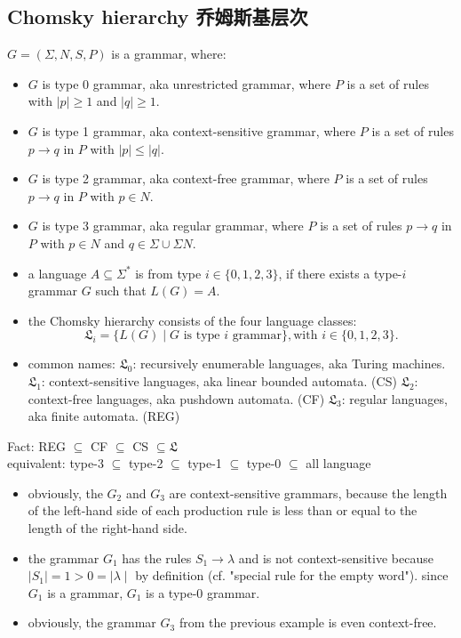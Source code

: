 \documentclass[a4paper,11pt,utf8]{article}
\newcommand{\newindent}{\\ \hspace*{\parindent}}
\begin{document}
\subsection{Chomsky hierarchy 乔姆斯基层次}
\begin{tcolorbox}[title=Chomsky hierarchy,colback=white,colframe=black,width=\textwidth,arc=0pt]
    $G = (\Sigma,N,S,P)$ is a grammar, where:
    \begin{itemize}
        \item $G$ is type 0 grammar, aka unrestricted grammar, where $P$ is a set of rules with $|p| \geq 1$ and $|q| \geq 1$.
        \item $G$ is type 1 grammar, aka context-sensitive grammar, where $P$ is a set of rules $p \to q$ in $P$ with $|p| \leq |q|$.
        \item $G$ is type 2 grammar, aka context-free grammar, where $P$ is a set of rules $p \to q$ in $P$ with $p \in N$.
        \item $G$ is type 3 grammar, aka regular grammar, where $P$ is a set of rules $p \to q$ in $P$ with $p \in N$ and $q \in \Sigma \cup \Sigma N$.
        \item a language $A \subseteq \Sigma^*$ is from type $i \in \{0,1,2,3\}$, if there exists a type-$i$ grammar $G$ such that $L(G) = A$.
        \item the Chomsky hierarchy consists of the four language classes: \[
            \mathfrak{L}_i = \{L(G) \mid G \text{ is type } i \text{ grammar}\}, \text{with } i \in \{0,1,2,3\}.
        \]
        \item common names:
        \subitem $\mathfrak{L}_0$: recursively enumerable languages, aka Turing machines.
        \subitem $\mathfrak{L}_1$: context-sensitive languages, aka linear bounded automata. (CS)
        \subitem $\mathfrak{L}_2$: context-free languages, aka pushdown automata. (CF)
        \subitem $\mathfrak{L}_3$: regular languages, aka finite automata. (REG)
    \end{itemize}
\end{tcolorbox}
Fact: REG $\subseteq$ CF $\subseteq$ CS $\subseteq \mathfrak{L}$ \newindent
equivalent: type-3 $\subseteq$ type-2 $\subseteq$ type-1 $\subseteq$ type-0 $\subseteq$ all language
\begin{tcolorbox}[title=example,colback=white,colframe=black,width=\textwidth,arc=0pt]
    \begin{itemize}
        \item obviously, the $G_2$ and $G_3$ are context-sensitive grammars, because the length of the left-hand side of each production rule is less than or equal to the length of the right-hand side.
        \item the grammar $G_1$ has the rules $S_1 \to \lambda$ and is not context-sensitive because $\mid S_1 \mid = 1 > 0 = \mid \lambda \mid$ by definition (cf. "special rule for the empty word"). since $G_1$ is a grammar, $G_1$ is a type-0 grammar.
        \item obviously, the grammar $G_3$ from the previous example is even context-free.
    \end{itemize}
\end{tcolorbox}
\end{document}
